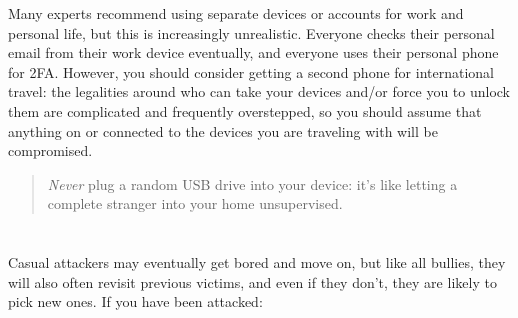 \documentclass[10pt,letterpaper]{article}
\providecommand{\DIFadd}[1]{{\protect\color{blue}\uwave{#1}}} %
\providecommand{\DIFaddbegin}{} %
\providecommand{\DIFaddend}{} %
\providecommand{\DIFdelbegin}{} %
\providecommand{\DIFdelend}{} %
\begin{document}
Many experts recommend using separate devices or accounts for work and personal
life, but this is increasingly unrealistic. Everyone checks their personal email
from their work device eventually, and everyone uses their personal phone for
2FA. However, you should consider getting a second phone for international
travel: the legalities around who can take your devices and/or force you to
unlock them are complicated and frequently overstepped, so you should assume
that anything on or connected to the devices you are traveling with will be
compromised.

\begin{quote}
  \emph{Never} plug a random USB drive into your device: it's like letting a
  complete stranger into your home unsupervised.
\end{quote}

\DIFdelbegin %
\DIFdelend \DIFaddbegin \section*{\DIFadd{Rule 9: Fight back.}}
\DIFaddend 

Casual attackers may eventually get bored and move on, but like all bullies,
they will also often revisit previous victims, and even if they don't, they are
likely to pick new ones. If you have been attacked:
\end{document}
